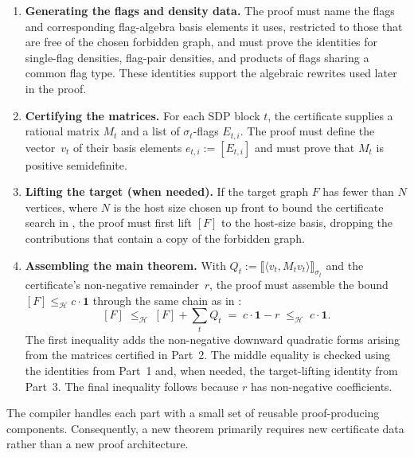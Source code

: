 \documentclass{article}
\begin{document}
\begin{enumerate}
  \item \textbf{Generating the flags and density data.}  The proof must name
    the flags and corresponding flag-algebra basis elements it uses,
    restricted to those that are free of the chosen forbidden graph, and must
    prove the identities for single-flag densities, flag-pair densities, and
    products of flags sharing a common flag type.
    These identities support the algebraic rewrites used later in the proof.
  \item \textbf{Certifying the matrices.}  For each SDP block $t$, the
    certificate supplies a rational matrix $M_t$ and a list of
    $\sigma_t$-flags $E_{t,i}$.  The proof must define the vector~$v_t$ of
    their basis elements $e_{t,i}:=[E_{t,i}]$ and must prove that $M_t$ is
    positive semidefinite.
  \item \textbf{Lifting the target (when needed).}  If the target graph $F$
    has fewer than $N$ vertices, where $N$ is the host size chosen up front to
    bound the certificate search in , the proof
    must first lift $[F]$ to the
    host-size basis, dropping the contributions that contain a copy of the
    forbidden graph.
  \item \textbf{Assembling the main theorem.}  With
    $Q_t:=\bigl\llbracket\langle v_t,M_t v_t\rangle\bigr\rrbracket_{\sigma_t}$
    and the certificate's non-negative remainder~$r$, the proof must assemble
    the bound $[F] \leq_{\mathcal{H}} c\cdot\mathbf{1}$ through the same chain as
    in :
    \[
      [F]
      \;\leq_{\mathcal H}\;
      [F] + \sum_t Q_t
      \;=\;
      c\cdot\mathbf{1}-r
      \;\leq_{\mathcal H}\;
      c\cdot\mathbf{1}.
    \]
    The first inequality adds the non-negative downward quadratic forms arising
    from the matrices certified in Part~2.  The middle equality is checked using
    the identities from Part~1 and, when needed, the target-lifting identity
    from Part~3.  The final inequality follows because $r$ has non-negative
    coefficients.
\end{enumerate}

The compiler handles each part with a small set of reusable proof-producing
components.  Consequently, a new theorem primarily requires new certificate
data rather than a new proof architecture.
\end{document}
